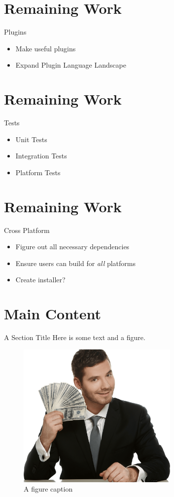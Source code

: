 \documentclass{beamer}
\begin{document}
\section{Remaining Work}
\begin{frame}{Plugins}
\begin{itemize}
  \item Make useful plugins
  \item Expand Plugin Language Landscape
\end{itemize}
\end{frame}

\section{Remaining Work}
\begin{frame}{Tests}
\begin{itemize}
  \item Unit Tests
  \item Integration Tests
  \item Platform Tests
\end{itemize}
\end{frame}

\section{Remaining Work}
\begin{frame}{Cross Platform}
\begin{itemize}
  \item Figure out all necessary dependencies
  \item Ensure users can build for \textit{all} platforms
  \item Create installer?
\end{itemize}
\end{frame}

\section{Main Content}
\begin{frame}{A Section Title}
    Here is some text and a figure.
    \begin{figure}
        \centering
        \includegraphics[width=0.7\textwidth]{../../pics/grindset.png}
        \caption{A figure caption}
    \end{figure}
\end{frame}
\end{document}

